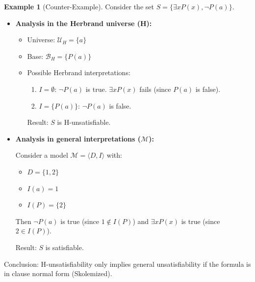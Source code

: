 \documentclass[11pt,a4paper]{article}
\theoremstyle{definition}
\newtheorem{example}{Example}[section]
\theoremstyle{plain}
\theoremstyle{remark}
\begin{document}
\begin{example}[Counter-Example]

Consider the set $S = \{ \exists x P(x), \neg P(a) \}$.

\begin{itemize}

    \item \textbf{Analysis in the Herbrand universe (H):}

    \begin{itemize}

        \item Universe: $\mathcal{U}_H = \{a\}$

        \item Base: $\mathcal{B}_H = \{P(a)\}$

        \item Possible Herbrand interpretations:

        \begin{enumerate}

            \item $I = \emptyset$: $\neg P(a)$ is true. $\exists x P(x)$ fails (since $P(a)$ is false).

            \item $I = \{ P(a) \}$: $\neg P(a)$ is false.

        \end{enumerate}

        Result: $S$ is H-unsatisfiable.

    \end{itemize}

    \item \textbf{Analysis in general interpretations ($\mathcal{M}$):}

    Consider a model $\mathcal{M} = \langle D, I \rangle$ with:

    \begin{itemize}

        \item $D = \{1, 2\}$

        \item $I(a) = 1$

        \item $I(P) = \{2\}$

    \end{itemize}

    Then $\neg P(a)$ is true (since $1 \notin I(P)$) and $\exists x P(x)$ is true (since $2 \in I(P)$).

    Result: $S$ is satisfiable.

\end{itemize}

Conclusion: H-unsatisfiability only implies general unsatisfiability if the formula is in clause normal form (Skolemized).

\end{example}
\end{document}
